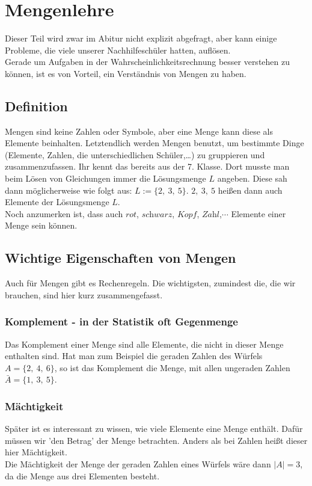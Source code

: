\section{Mengenlehre}
	Dieser Teil wird zwar im Abitur nicht explizit abgefragt, aber kann einige
	Probleme, die viele unserer Nachhilfeschüler hatten, auflösen.\\
	Gerade um Aufgaben in der Wahrscheinlichkeitsrechnung besser verstehen zu
	können, ist es von Vorteil, ein Verständnis von Mengen zu haben.

	\subsection{Definition}
		Mengen sind keine Zahlen oder Symbole, aber eine Menge kann diese als Elemente
		beinhalten. Letztendlich werden Mengen benutzt, um bestimmte Dinge
		(Elemente, Zahlen, die unterschiedlichen Schüler,\ldots) zu gruppieren und
		zusammenzufassen. Ihr kennt das bereits aus der 7. Klasse. Dort musste man
		beim Lösen von Gleichungen immer die Lösungsmenge \(L\) angeben. Diese sah
		dann möglicherweise wie folgt aus: \(L:=\{2,\ 3,\ 5\}\). \(2,\ 3,\ 5\) heißen
		dann auch Elemente der Lösungsmenge \(L\).\\
		Noch anzumerken ist, dass auch \(\textit{rot}\), \(\textit{schwarz}\),
		\(\textit{Kopf}\), \(\textit{Zahl}\),\(\cdots\) Elemente einer Menge sein
		können.\\

	\subsection{Wichtige Eigenschaften von Mengen}
			Auch für Mengen gibt es Rechenregeln. Die wichtigsten, zumindest die, die wir
			brauchen, sind hier kurz zusammengefasst.
			\subsubsection{Komplement - in der Statistik oft Gegenmenge}
				Das Komplement einer Menge sind alle Elemente, die nicht in dieser Menge
				enthalten sind. Hat man zum Beispiel die geraden Zahlen des Würfels
				\(A=\{2,\ 4,\ 6\}\), so ist das Komplement die Menge, mit allen ungeraden
				Zahlen \(\bar{A}=\{1,\ 3,\ 5\}\).
			\subsubsection{Mächtigkeit}
				Später ist es interessant zu wissen, wie viele Elemente eine Menge enthält.
				Dafür müssen wir 'den Betrag' der Menge betrachten. Anders als bei Zahlen
				heißt dieser hier Mächtigkeit.\\
				Die Mächtigkeit der Menge der geraden Zahlen eines Würfels wäre dann
				\(|A|=3\), da die Menge aus drei Elementen besteht.
